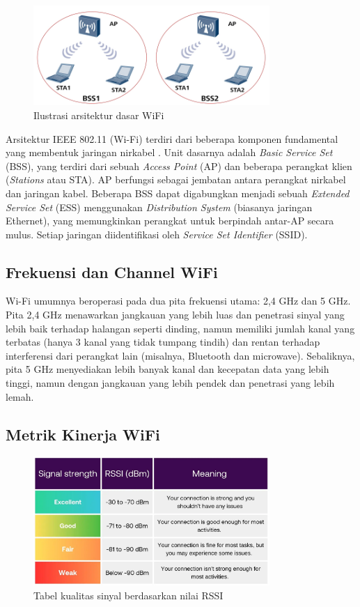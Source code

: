 \begin{figure}[htbp]
    \centering
    \includegraphics[width=0.8\textwidth]{assets/pics/bss.png}
    \caption{Ilustrasi arsitektur dasar WiFi}
    \label{fig:wifi_architecture}
\end{figure}

Arsitektur IEEE 802.11 (Wi-Fi) terdiri dari beberapa komponen fundamental yang membentuk jaringan nirkabel \cite{cisco_wifi_6}. Unit dasarnya adalah \textit{Basic Service Set} (BSS), yang terdiri dari sebuah \textit{Access Point} (AP) dan beberapa perangkat klien (\textit{Stations} atau STA). AP berfungsi sebagai jembatan antara perangkat nirkabel dan jaringan kabel. Beberapa BSS dapat digabungkan menjadi sebuah \textit{Extended Service Set} (ESS) menggunakan \textit{Distribution System} (biasanya jaringan Ethernet), yang memungkinkan perangkat untuk berpindah antar-AP secara mulus. Setiap jaringan diidentifikasi oleh \textit{Service Set Identifier} (SSID).

\subsection{Frekuensi dan Channel WiFi}
Wi-Fi umumnya beroperasi pada dua pita frekuensi utama: 2,4 GHz dan 5 GHz. Pita 2,4 GHz menawarkan jangkauan yang lebih luas dan penetrasi sinyal yang lebih baik terhadap halangan seperti dinding, namun memiliki jumlah kanal yang terbatas (hanya 3 kanal yang tidak tumpang tindih) dan rentan terhadap interferensi dari perangkat lain (misalnya, Bluetooth dan microwave). Sebaliknya, pita 5 GHz menyediakan lebih banyak kanal dan kecepatan data yang lebih tinggi, namun dengan jangkauan yang lebih pendek dan penetrasi yang lebih lemah.

\subsection{Metrik Kinerja WiFi}

\begin{figure}[htbp]
    \centering
    \includegraphics[width=0.8\textwidth]{assets/pics/rssi.png}
    \caption{Tabel kualitas sinyal berdasarkan nilai RSSI}
    \label{fig:rssi}
\end{figure}

